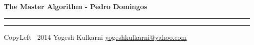
\graphicspath{{./images/}}
\usepackage{beamerarticle} %



\begin{center}
     \Large{\textbf{The Master Algorithm - Pedro Domingos}}  %
\end{center}
\rule{\linewidth}{0.25pt}
\raggedright
\footnotesize
\begin{multicols}{3}




\rule{0.3\linewidth}{0.25pt}

\scriptsize
CopyLeft \textcopyleft\ 2014 Yogesh Kulkarni
\href{http://www.yogeshkulkarni.com}{yogeshkulkarni@yahoo.com}

\end{multicols}

